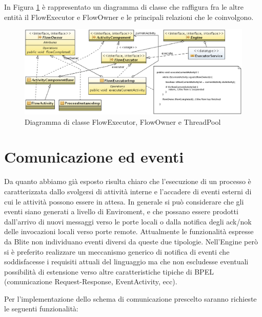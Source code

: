 In Figura \ref{fig:flowclass} \`e rappresentato un diagramma di classe che
raffigura fra le altre entità il FlowExecutor e FlowOwner e le principali
relazioni che le coinvolgono.

\begin{figure}[p]
\begin{center}
\includegraphics[angle=90,scale=0.75]
{architettura_interna/dia/flowClassDiagram}
\caption[Diagramma di classe FlowExecutor \ldots] {
   	\textsf{{\small Diagramma di classe FlowExecutor, FlowOwner e ThreadPool}} }
  \label{fig:flowclass}
\end{center}
\end{figure}

\section{Comunicazione ed eventi}
Da quanto abbiamo già esposto risulta chiaro che l'esecuzione di un processo \`e
caratterizzata dallo svolgersi di attività interne e l'accadere di eventi
esterni di cui le attività possono essere in attesa. In generale si può
considerare che gli eventi siano generati a livello di Enviroment, e che possano
essere prodotti dall'arrivo di nuovi messaggi verso le porte locali o
dalla notifica degli ack/nok delle invocazioni locali
verso porte remote. Attualmente le funzionalità espresse da Blite non
individuano eventi diversi da queste due tipologie. Nell'Engine però si \`e
preferito realizzare un meccanismo generico di notifica di eventi che
soddisfacesse i requisiti attuali del linguaggio ma che non escludesse eventuali
possibilità di estensione verso altre caratteristiche tipiche di BPEL
(comunicazione Request-Response, EventActivity, ecc).

Per l'implementazione dello schema di comunicazione prescelto saranno richieste
le seguenti funzionalità:

